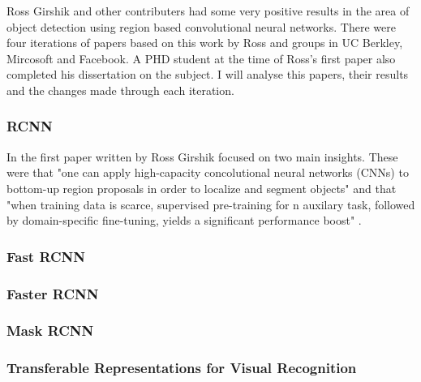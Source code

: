 Ross Girshik and other contributers had some very positive results in the area
of object detection using region based convolutional neural networks. There were
four iterations of papers based on this work by Ross and groups in UC Berkley,
Mircosoft and Facebook. A PHD student at the time of Ross's first paper also
completed his dissertation on the subject. I will analyse this papers, their
results and the changes made through each iteration.

\subsubsection{RCNN}
In the first paper written by Ross Girshik focused on two main insights. These
were that "one can apply high-capacity concolutional neural networks (CNNs) to
bottom-up region proposals in order to localize and segment objects" and that
"when training data is scarce, supervised pre-training for n auxilary task,
followed by domain-specific fine-tuning, yields a significant performance boost"
\textcite{rcnn}.
\subsubsection{Fast RCNN}
\textcite{fastRcnn}
\subsubsection{Faster RCNN}
\textcite{fatserRcnn}
\subsubsection{Mask RCNN}
\textcite{maskRcnn}
\subsubsection{Transferable Representations for Visual Recognition}
